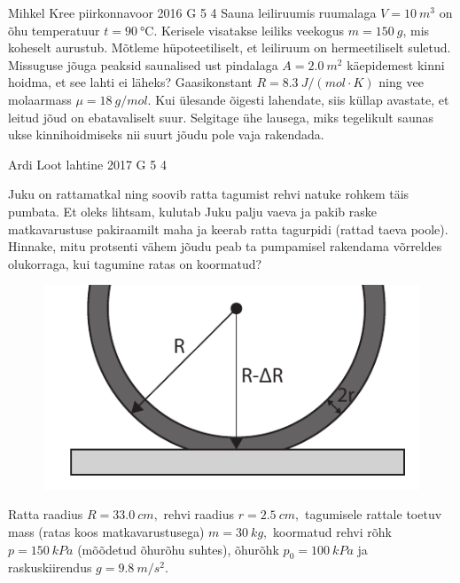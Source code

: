 \documentclass[11pt]{article}
\begin{document}
{%
{Mihkel Kree} %
{piirkonnavoor} %
{2016} %
{G 5} %
{4} %
{
\ifStatement
Sauna leiliruumis ruumalaga $V=\SI{10}{m^3}$ on õhu temperatuur $t=\SI{90}{\celsius}$. Kerisele visatakse leiliks veekogus $m=\SI{150}{g}$, mis koheselt aurustub. Mõtleme hüpoteetiliselt, et leiliruum on hermeetiliselt suletud. Missuguse jõuga peaksid saunalised ust pindalaga $A=\SI{2,0}{m^2}$ käepidemest kinni hoidma, et see lahti ei läheks? Gaasikonstant $R=\SI{8.3}{J \per (mol\!\cdot\! K)}$ ning vee molaarmass $\mu=\SI{18}{g\per mol}$. Kui ülesande õigesti lahendate, siis küllap avastate, et leitud jõud on ebatavaliselt suur. Selgitage ühe lausega, miks tegelikult saunas ukse kinnihoidmiseks nii suurt jõudu pole vaja rakendada.
\fi
}

{Ardi Loot} %
{lahtine} %
{2017} %
{G 5} %
{4} %
{
\ifStatement
Juku on rattamatkal ning soovib ratta tagumist rehvi natuke rohkem
täis pumbata. Et oleks lihtsam, kulutab Juku palju vaeva ja pakib
raske matkavarustuse pakiraamilt maha ja keerab ratta tagurpidi (rattad
taeva poole). Hinnake, mitu protsenti vähem jõudu peab ta pumpamisel
rakendama võrreldes olukorraga, kui tagumine ratas on koormatud?

\begin{figure}
	\vspace{-15pt}
	\includegraphics[width=\linewidth]{2017-lahg-05-fig_rattakumm.pdf}
\end{figure}

Ratta raadius $R=\SI{33.0}{cm},$ rehvi raadius $r=\SI{2.5}{cm},$
tagumisele rattale toetuv mass (ratas koos matkavarustusega) $m=\SI{30}{kg},$
koormatud rehvi rõhk $p=\SI{150}{kPa}$ (mõõdetud õhurõhu suhtes), õhurõhk $p_{0}=\SI{100}{kPa}$
ja raskuskiirendus $g=\SI{9.8}{m/s^{2}}.$ 

}}
\end{document}
